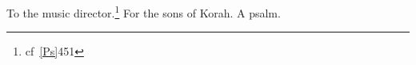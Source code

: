 
\begin{inparaenum}
    {\noindent{} To the music director.\footnote{cf~\vref{Ps}{45}{1}} For the sons of Korah. A psalm.}%
    
    
    
    
    
    
    
    
    
    
    \pvcb{}{}%
\end{inparaenum}

